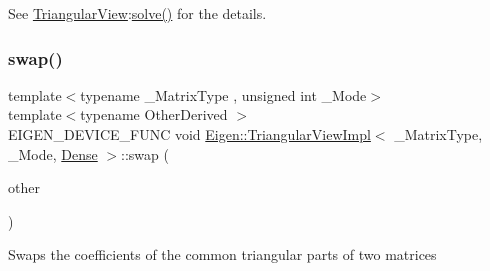 See \mbox{\hyperlink{class_eigen_1_1_triangular_view}{Triangular\+View}}\+:\mbox{\hyperlink{class_eigen_1_1_triangular_view_impl_3_01___matrix_type_00_01___mode_00_01_dense_01_4_a1a8d18cb8da794090603a5c263c15395}{solve()}} for the details. \mbox{\label{class_eigen_1_1_triangular_view_impl_3_01___matrix_type_00_01___mode_00_01_dense_01_4_a154127e98e3b30d829220c61eb3c12b1}} 
\subsubsection{\texorpdfstring{swap()}{swap()}\hspace{0.1cm}{\footnotesize\ttfamily [1/2]}}
{\footnotesize\ttfamily template$<$typename \+\_\+\+Matrix\+Type , unsigned int \+\_\+\+Mode$>$ \\
template$<$typename Other\+Derived $>$ \\
E\+I\+G\+E\+N\+\_\+\+D\+E\+V\+I\+C\+E\+\_\+\+F\+U\+NC void \mbox{\hyperlink{class_eigen_1_1_triangular_view_impl}{Eigen\+::\+Triangular\+View\+Impl}}$<$ \+\_\+\+Matrix\+Type, \+\_\+\+Mode, \mbox{\hyperlink{struct_eigen_1_1_dense}{Dense}} $>$\+::swap (\begin{DoxyParamCaption}\item[{\mbox{\hyperlink{class_eigen_1_1_triangular_base}{Triangular\+Base}}$<$ Other\+Derived $>$ const \&}]{other }\end{DoxyParamCaption})\hspace{0.3cm}{\ttfamily [inline]}}

Swaps the coefficients of the common triangular parts of two matrices \mbox{\label{class_eigen_1_1_triangular_view_impl_3_01___matrix_type_00_01___mode_00_01_dense_01_4_a4723aa22f7e47d8d125079fe4f40f950}} 
